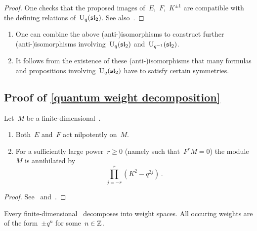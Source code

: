 \documentclass[a4paper, 11pt, oneside]{scrartcl}
\begin{document}
\begin{proof}
  One checks that the proposed images of~$E$,~$F$,~$K^{\pm 1}$ are compatible with the defining relations of~$\operatorname{U}_q(\mathfrak{sl}_2)$.
  See also~\cite[Lemma~1.2]{jantzen_quantum}.
\end{proof}

\begin{remark}
  \leavevmode
  \begin{enumerate}
    \item
      One can combine the above (anti-)isomorphisms to construct further (anti-)isomorphisms involving~$\operatorname{U}_q(\mathfrak{sl}_2)$ and~$\operatorname{U}_{q^{-1}}(\mathfrak{sl}_2)$.
    \item
      It follows from the existence of these (anti-)isomorphisms that many formulas and propositions involving~$\operatorname{U}_q(\mathfrak{sl}_2)$ have to satisfy certain symmetries.
  \end{enumerate}
\end{remark}




\subsection{Proof of \cref{quantum weight decomposition}}
\label{proof of quantum weight decomposition}

\begin{lemma}
  \label{action on finite dimensional modules}
  Let~$M$ be a finite-dimensional~.
  \begin{enumerate}
    \item
      Both~$E$ and~$F$ act nilpotently on~$M$.
    \item
      For a sufficiently large power~$r \geq 0$ (namely such that~$F^r M = 0$) the module~$M$ is annihilated by
      \[
        \prod_{j = -r}^r (K^2 - q^{2j}) \,.
      \]
  \end{enumerate}
\end{lemma}

\begin{proof}
  See~\cite[Proposition~2.1]{jantzen_quantum} and~\cite[Proposition~2.3]{jantzen_quantum}.
\end{proof}

\begin{proposition}
  Every finite-dimensional~ decomposes into weight spaces.
  All occuring weights are of the form~$\pm q^n$ for some~$n \in \mathbb{Z}$.
\end{proposition}
\end{document}
